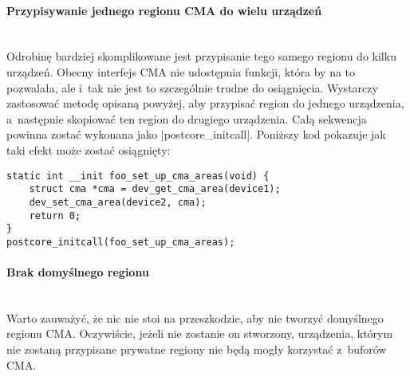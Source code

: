 \paragraph{Przypisywanie jednego regionu CMA do wielu urządzeń} \hspace{0pt} \\

Odrobinę bardziej skomplikowane jest przypisanie tego samego regionu
do kilku urządzeń.  Obecny interfejs CMA nie udostępnia funkcji, która
by na to pozwalała, ale i~tak nie jest to szczególnie trudne do
osiągnięcia.  Wystarczy zastosować metodę opisaną powyżej, aby
przypisać region do jednego urządzenia, a~następnie skopiować ten
region do drugiego urządzenia.  Całą sekwencja powinna zostać wykonana
jako \code|postcore_initcall|.  Poniższy kod pokazuje jak taki
efekt może zostać osiągnięty:

\begin{lstlisting}
static int __init foo_set_up_cma_areas(void) {
	struct cma *cma = dev_get_cma_area(device1);
	dev_set_cma_area(device2, cma);
	return 0;
}
postcore_initcall(foo_set_up_cma_areas);
\end{lstlisting}

\paragraph{Brak domyślnego regionu} \hspace{0pt} \\

Warto zauważyć, że nic nie stoi na przeszkodzie, aby nie tworzyć
domyślnego regionu CMA.  Oczywiście, jeżeli nie zostanie on stworzony,
urządzenia, którym nie zostaną przypisane prywatne regiony nie będą
mogły korzystać z~buforów CMA.
